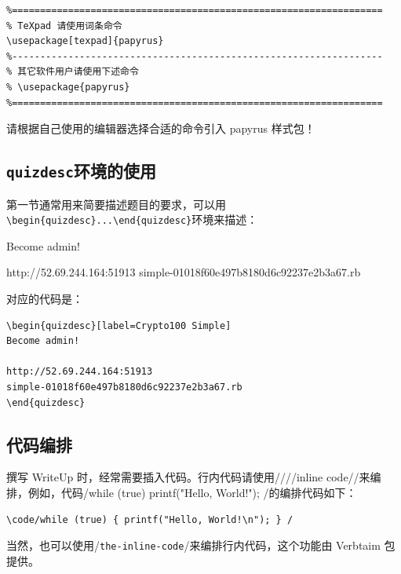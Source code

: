 \documentclass[a4paper,UTF8]{ctexart}
\begin{document}
\begin{verbatim}
%==================================================================
% TeXpad 请使用词条命令
\usepackage[texpad]{papyrus}
%------------------------------------------------------------------
% 其它软件用户请使用下述命令
% \usepackage{papyrus}
%==================================================================
\end{verbatim}

请根据自己使用的编辑器选择合适的命令引入 papyrus 样式包！

\subsection{\texttt{quizdesc}环境的使用}

第一节通常用来简要描述题目的要求，可以用\verb|\begin{quizdesc}...\end{quizdesc}|环境来描述：\\


\begin{quizdesc}[label=Crypto100 Simple]
Become admin!

http://52.69.244.164:51913
simple-01018f60e497b8180d6c92237e2b3a67.rb
\end{quizdesc}

对应的代码是：

\begin{verbatim}
\begin{quizdesc}[label=Crypto100 Simple]
Become admin!

http://52.69.244.164:51913
simple-01018f60e497b8180d6c92237e2b3a67.rb
\end{quizdesc}
\end{verbatim}


\subsection{代码编排}

撰写 WriteUp 时，经常需要插入代码。行内代码请使用\code/\code/\slash \code/inline code/\slash 来编排，例如，代码\code/while (true) { printf("Hello, World!\n"); } /的编排代码如下：

\begin{verbatim}
\code/while (true) { printf("Hello, World!\n"); } /
\end{verbatim}

当然，也可以使用\code/\verb|the-inline-code|/来编排行内代码，这个功能由 Verbtaim 包提供。
\end{document}
